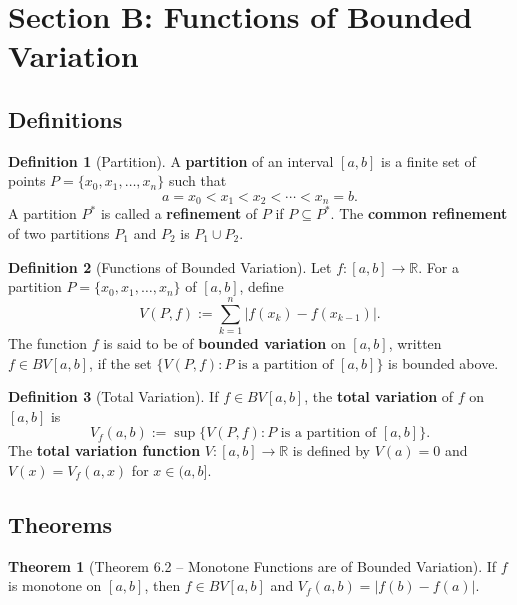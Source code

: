 \documentclass[12pt,a4paper]{article}
\theoremstyle{definition}
\newtheorem{definition}{Definition}[section]
\newtheorem{theorem}{Theorem}[section]
\newcommand{\R}{\mathbb{R}}
\begin{document}
\section{Section B: Functions of Bounded Variation}

\subsection{Definitions}

\begin{definition}[Partition]
A \textbf{partition} of an interval $[a,b]$ is a finite set of points $P = \{x_0, x_1, \ldots, x_n\}$ such that
\[
    a = x_0 < x_1 < x_2 < \cdots < x_n = b.
\]
A partition $P^*$ is called a \textbf{refinement} of $P$ if $P \subseteq P^*$. The \textbf{common refinement} of two partitions $P_1$ and $P_2$ is $P_1 \cup P_2$.
\end{definition}

\begin{definition}[Functions of Bounded Variation]
Let $f: [a,b] \to \R$. For a partition $P = \{x_0, x_1, \ldots, x_n\}$ of $[a,b]$, define
\[
    V(P, f) := \sum_{k=1}^{n} |f(x_k) - f(x_{k-1})|.
\]
The function $f$ is said to be of \textbf{bounded variation} on $[a,b]$, written $f \in BV[a,b]$, if the set $\{V(P, f) : P \text{ is a partition of } [a,b]\}$ is bounded above.
\end{definition}

\begin{definition}[Total Variation]
If $f \in BV[a,b]$, the \textbf{total variation} of $f$ on $[a,b]$ is
\[
    V_f(a,b) := \sup\{V(P, f) : P \text{ is a partition of } [a,b]\}.
\]
The \textbf{total variation function} $V: [a,b] \to \R$ is defined by $V(a) = 0$ and $V(x) = V_f(a,x)$ for $x \in (a,b]$.
\end{definition}

\subsection{Theorems}

\begin{theorem}[Theorem 6.2 -- Monotone Functions are of Bounded Variation]
If $f$ is monotone on $[a,b]$, then $f \in BV[a,b]$ and $V_f(a,b) = |f(b) - f(a)|$.
\end{theorem}
\end{document}
